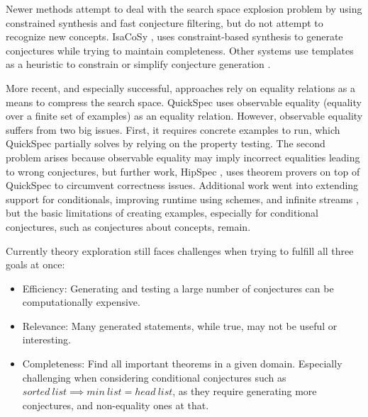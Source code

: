 Newer methods attempt to deal with the search space explosion problem by using constrained synthesis and fast conjecture filtering, but do not attempt to recognize new concepts.
IsaCoSy \cite{JAR2010:Johanssonisacosy}, uses constraint-based synthesis to generate conjectures while trying to maintain completeness.
Other systems use templates as a heuristic to constrain or simplify conjecture generation \cite{einarsdottir2020template,ESA2012:Montanoschemebased,mccasland2006mathsaid}. 

More recent, and especially successful, approaches rely on equality relations as a means to compress the search space.
QuickSpec \cite{JFP2017:Smallbonequickspec2, claessen2010quickspec1} uses observable equality (equality over a finite set of examples) as an equality relation.
However, observable equality suffers from two big issues.
First, it requires concrete examples to run, which QuickSpec partially solves by relying on the property testing. 
The second problem arises because observable equality may imply incorrect equalities leading to wrong conjectures, but further work, HipSpec \cite{hipster}, uses theorem provers on top of QuickSpec to circumvent correctness issues.
Additional work went into extending support for conditionals, improving runtime using schemes, and infinite streams \cite{ESA2012:Montanoschemebased, hipstercond, einarsdottir2020template, 2018AISC:Einarsdottir}, but the basic limitations of creating examples, especially for conditional conjectures, such as conjectures about concepts, remain.

Currently theory exploration still faces challenges when trying to fulfill all three goals at once:
\begin{itemize}
    \item Efficiency: Generating and testing a large number of conjectures can be computationally expensive.
    \item Relevance: Many generated statements, while true, may not be useful or interesting.
    \item Completeness: Find all important theorems in a given domain. Especially challenging when considering conditional conjectures such as $sorted~list \implies min~list = head~list$, as they require generating more conjectures, and non-equality ones at that.
\end{itemize}

